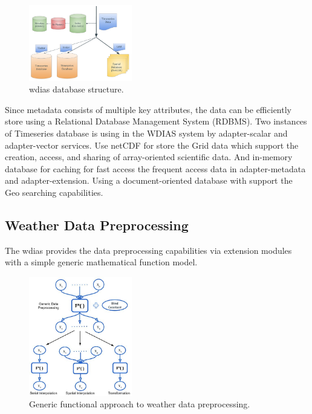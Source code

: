 \documentclass[conference]{IEEEtran}
\begin{document}
\begin{figure}[t!]
\centerline{\includegraphics[width=0.4\textwidth]{method/microservice/wdias_database_structure.pdf}}
\caption{\acrshort{wdias} database structure.}
\label{pfi:database_structure}
\end{figure}

Since metadata consists of multiple key attributes, the data can be efficiently store using a Relational Database Management System (RDBMS). Two instances of Timeseries database is using in the WDIAS system by adapter-scalar and adapter-vector services. Use \acrfull{netCDF} for store the Grid data which support the creation, access, and sharing of array-oriented scientific data. And  in-memory database for caching for fast access the frequent access data in adapter-metadata and adapter-extension. Using a document-oriented database with support the Geo searching capabilities.

\subsection{Weather Data Preprocessing}
\label{psubse:data_preprocessing}

The \acrshort{wdias} provides the data preprocessing capabilities via extension modules with a simple generic mathematical function model.

\begin{figure}[t!]
\centerline{\includegraphics[width=0.4\textwidth]{method/data_preprocess/summary_weather_data_preprocessing.jpg}}
\caption{Generic functional approach to weather data preprocessing.}
\label{pfi:summary_weather_data_preprocessing}
\end{figure}
\end{document}
